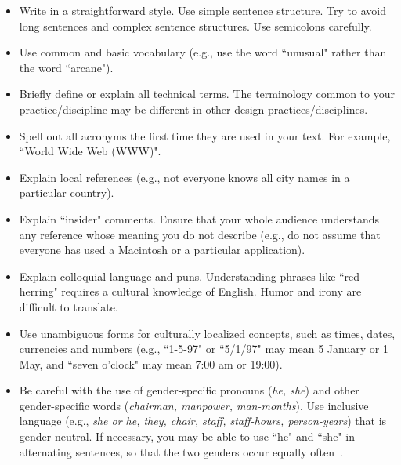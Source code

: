 \documentclass{sigchi-ext}
\begin{document}
\begin{itemize}\compresslist
\item 	
Write in a straightforward style. 
Use simple sentence structure. 
Try to avoid long sentences and complex sentence structures. 
Use semicolons carefully.
\item 	
Use common and basic vocabulary (e.g., use the word ``unusual" rather than the word ``arcane").
\item 	
Briefly define or explain all technical terms. 
The terminology common to your practice/discipline may be different in other design practices/disciplines.
\item 	
Spell out all acronyms the first time they are used in your text. 
For example, ``World Wide Web (WWW)".
\item 	
Explain local references (e.g., not everyone knows all city names in a particular country).
\item 	
Explain ``insider" comments. 
Ensure that your whole audience understands any reference whose meaning you do not describe (e.g., do not assume that everyone has used a Macintosh or a particular application).
\item 	
Explain colloquial language and puns. 
Understanding phrases like ``red herring" requires a cultural knowledge of English. 
Humor and irony are difficult to translate.
\item 	
Use unambiguous forms for culturally localized concepts, such as times, dates, currencies and numbers (e.g., ``1-5-97" or ``5/1/97" may mean 5 January or 1 May, and ``seven o'clock" may mean 7:00 am or 19:00).

\item 	
Be careful with the use of gender-specific pronouns (\emph{he, she}) and other gender-specific words (\emph{chairman, manpower, man-months}). 
Use inclusive language (e.g., \emph{she or he, they, chair, staff, staff-hours, person-years}) that is gender-neutral. 
If necessary, you may be able to use ``he" and ``she" in alternating sentences, so that the two genders occur equally often~\cite{Schwartz95}. 
\end{itemize}
\end{document}
